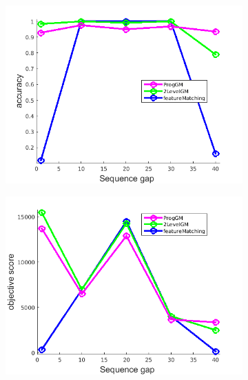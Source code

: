 \documentclass[
	fontsize=12pt,
	paper=a4,
	twoside=false,
	numbers=noenddot,
	plainheadsepline,
	toc=listof,
	toc=bibliography
]{scrartcl}
\begin{document}
\begin{figure}[h] 
	\begin{subfigure}[b]{0.3\textwidth}
		\centering
		\includegraphics[scale=0.25]{"fig_ver2608/RealImages/ImgTrafo/no_descr/using_cpd_afftrafo/performance/accuracy"}  
	\end{subfigure}%
	\begin{subfigure}[b]{0.3\textwidth}
		\centering
		\includegraphics[scale=0.25]{"fig_ver2608/RealImages/ImgTrafo/no_descr/using_cpd_afftrafo/performance/score"}  
	\end{subfigure} 
	\begin{subfigure}[b]{0.3\textwidth}
		\centering

\end{subfigure}
\end{figure}
\end{document}
